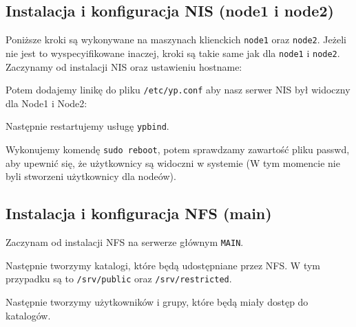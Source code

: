 \subsection{Instalacja i konfiguracja NIS (node1 i node2)}

Poniższe kroki są wykonywane na maszynach klienckich \texttt{node1} oraz \texttt{node2}. Jeżeli nie jest to wyspecyifikowane inaczej, kroki są takie same jak dla \texttt{node1} i \texttt{node2}.\\

\label{sec:nis-installation-node}
Zaczynamy od instalacji NIS oraz ustawieniu hostname:\\

Potem dodajemy linikę do pliku \texttt{/etc/yp.conf} aby nasz serwer NIS był widoczny dla Node1 i Node2:\\

\clearpage
Następnie restartujemy usługę \texttt{ypbind}.\\


Wykonujemy komendę \texttt{sudo reboot}, potem sprawdzamy zawartość pliku passwd, aby upewnić się, że użytkownicy są widoczni w systemie (W tym momencie nie byli stworzeni użytkownicy dla nodeów).\\ 

\clearpage

\subsection{Instalacja i konfiguracja NFS (main)}
\label{sec:nfs-installation}

Zaczynam od instalacji NFS na serwerze głównym \texttt{MAIN}.\\

Następnie tworzymy katalogi, które będą udostępniane przez NFS. W tym przypadku są to \texttt{/srv/public} oraz \texttt{/srv/restricted}.\\

Następnie tworzymy użytkowników i grupy, które będą miały dostęp do katalogów.\\

